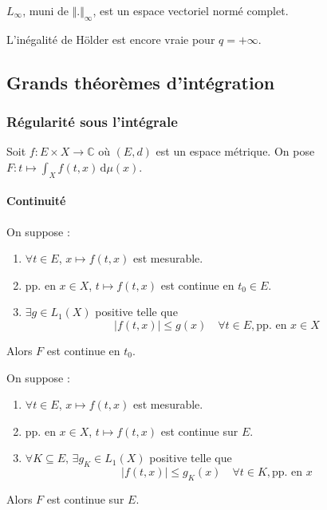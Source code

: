   \begin{theorem}
    $L_\infty$, muni de $\Vert . \Vert_\infty$, est un espace vectoriel normé complet.
  \end{theorem}

  \begin{remark}
    L'inégalité de Hölder est encore vraie pour $q = +\infty$.
  \end{remark}

  \subsection{Grands théorèmes d'intégration}

  \subsubsection{Régularité sous l'intégrale}


  Soit $f : E \times X \rightarrow \mathbb{C}$ où $(E, d)$ est un espace métrique. On pose $F : t \mapsto \int_X f(t, x) \, \mathrm{d}\mu(x)$.

  \paragraph{Continuité}

  \begin{theorem}
    On suppose :
    \begin{enumerate}[label={\bfseries(\roman*)}]
      \item $\forall t \in E$, $x \mapsto f(t,x)$ est mesurable.
      \item pp. en $x \in X$, $t \mapsto f(t,x)$ est continue en $t_0 \in E$.
      \item $\exists g \in L_1(X)$ positive telle que
      \[ |f(t,x)| \leq g(x) \quad \forall t \in E, \text{pp. en } x \in X \]
    \end{enumerate}
    Alors $F$ est continue en $t_0$.
  \end{theorem}

  \begin{corollary}
    On suppose :
    \begin{enumerate}[label={\bfseries(\roman*)}]
      \item $\forall t \in E$, $x \mapsto f(t,x)$ est mesurable.
      \item pp. en $x \in X$, $t \mapsto f(t,x)$ est continue sur $E$.
      \item $\forall K \subseteq E, \, \exists g_K \in L_1(X)$ positive telle que
      \[ |f(t,x)| \leq g_K(x) \quad \forall t \in K, \text{pp. en } x \]
    \end{enumerate}
    Alors $F$ est continue sur $E$.
  \end{corollary}

